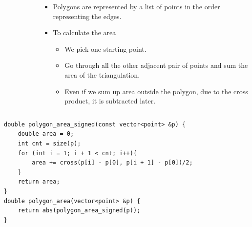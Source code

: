 \documentclass{beamer}
\begin{document}
\begin{frame}[plain]
\begin{columns}
\begin{column}{0.4\textwidth}
\begin{figure}
      \end{figure}
    \end{column}
    \begin{column}{0.6\textwidth}
      \begin{itemize}
        \item Polygons are represented by a list of points in the order
          representing the edges.
        \item To calculate the area
          \begin{itemize}
            \item We pick one starting point.
            \item Go through all the other adjacent pair of points and sum the
              area of the triangulation.
            \item Even if we sum up area outside the polygon, due to the cross
              product, it is subtracted later.
          \end{itemize}
      \end{itemize}
    \end{column}
  \end{columns}
\end{frame}

\begin{frame}
  \vspace{20pt}
  \footnotesize
  \begin{verbatim}
double polygon_area_signed(const vector<point> &p) {
    double area = 0;
    int cnt = size(p);
    for (int i = 1; i + 1 < cnt; i++){
        area += cross(p[i] - p[0], p[i + 1] - p[0])/2;
    }
    return area;
}
double polygon_area(vector<point> &p) {
    return abs(polygon_area_signed(p));
}
  \end{verbatim}
\end{frame}
\end{document}
